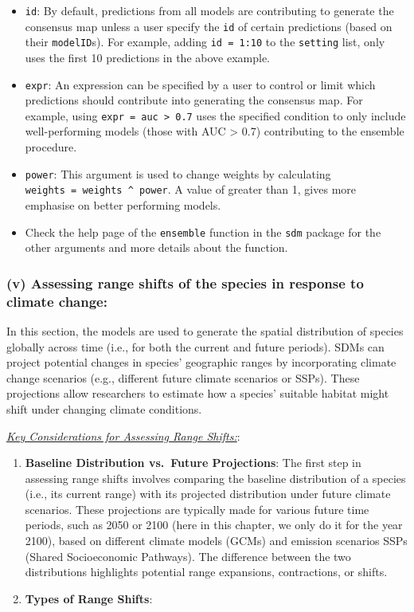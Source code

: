 \documentclass[
]{article}
\begin{document}
\begin{itemize}
\item
  \texttt{id}: By default, predictions from all models are contributing
  to generate the consensus map unless a user specify the \texttt{id} of
  certain predictions (based on their \texttt{modelID}s). For example,
  adding \texttt{id\ =\ 1:10} to the \texttt{setting} list, only uses
  the first 10 predictions in the above example.
\item
  \texttt{expr}: An expression can be specified by a user to control or
  limit which predictions should contribute into generating the
  consensus map. For example, using
  \texttt{expr\ =\ auc\ \textgreater{}\ 0.7} uses the specified
  condition to only include well-performing models (those with AUC
  \textgreater{} 0.7) contributing to the ensemble procedure.
\item
  \texttt{power}: This argument is used to change weights by calculating
  \texttt{weights\ =\ weights\ \^{}\ power}. A value of greater than 1,
  gives more emphasise on better performing models.
\item
  Check the help page of the \texttt{ensemble} function in the
  \texttt{sdm} package for the other arguments and more details about
  the function.
\end{itemize}

\subsubsection{(v) Assessing range shifts of the species in response to
climate
change:}\label{v-assessing-range-shifts-of-the-species-in-response-to-climate-change}

In this section, the models are used to generate the spatial
distribution of species globally across time (i.e., for both the current
and future periods). SDMs can project potential changes in species'
geographic ranges by incorporating climate change scenarios (e.g.,
different future climate scenarios or SSPs). These projections allow
researchers to estimate how a species' suitable habitat might shift
under changing climate conditions.

\uline{\textit{Key Considerations for Assessing Range Shifts:}}:

\begin{enumerate}
\def\labelenumi{\alph{enumi})}
\item
  \textbf{Baseline Distribution vs.~Future Projections}: The first step
  in assessing range shifts involves comparing the baseline distribution
  of a species (i.e., its current range) with its projected distribution
  under future climate scenarios. These projections are typically made
  for various future time periods, such as 2050 or 2100 (here in this
  chapter, we only do it for the year 2100), based on different climate
  models (GCMs) and emission scenarios SSPs (Shared Socioeconomic
  Pathways). The difference between the two distributions highlights
  potential range expansions, contractions, or shifts.
\item
  \textbf{Types of Range Shifts}:
\end{enumerate}
\end{document}
